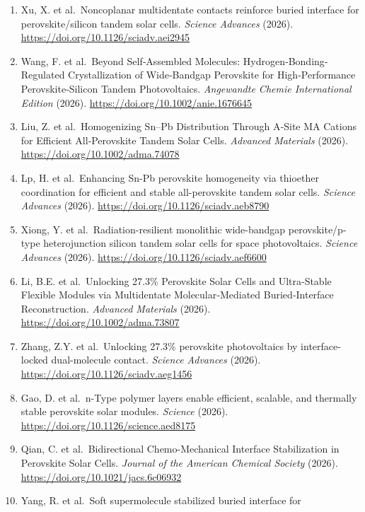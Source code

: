 \documentclass[
  11pt,
]{article}
\providecommand{\tightlist}{%
  \setlength{\itemsep}{0pt}\setlength{\parskip}{0pt}}
\begin{document}
\begin{enumerate}
\def\labelenumi{\arabic{enumi}.}
\tightlist
\item
  Xu, X. et al.~Noncoplanar multidentate contacts reinforce buried
  interface for perovskite/silicon tandem solar cells. \emph{Science
  Advances} (2026). \url{https://doi.org/10.1126/sciadv.aei2945}
\item
  Wang, F. et al.~Beyond Self‐Assembled Molecules:
  Hydrogen‐Bonding‐Regulated Crystallization of Wide‐Bandgap Perovskite
  for High‐Performance Perovskite‐Silicon Tandem Photovoltaics.
  \emph{Angewandte Chemie International Edition} (2026).
  \url{https://doi.org/10.1002/anie.1676645}
\item
  Liu, Z. et al.~Homogenizing Sn--Pb Distribution Through A‐Site MA
  Cations for Efficient All‐Perovskite Tandem Solar Cells.
  \emph{Advanced Materials} (2026).
  \url{https://doi.org/10.1002/adma.74078}
\item
  Lp, H. et al.~Enhancing Sn-Pb perovskite homogeneity via thioether
  coordination for efficient and stable all-perovskite tandem solar
  cells. \emph{Science Advances} (2026).
  \url{https://doi.org/10.1126/sciadv.aeb8790}
\item
  Xiong, Y. et al.~Radiation-resilient monolithic wide-bandgap
  perovskite/p-type heterojunction silicon tandem solar cells for space
  photovoltaics. \emph{Science Advances} (2026).
  \url{https://doi.org/10.1126/sciadv.aef6600}
\item
  Li, B.E. et al.~Unlocking 27.3\% Perovskite Solar Cells and
  Ultra‐Stable Flexible Modules via Multidentate Molecular‐Mediated
  Buried‐Interface Reconstruction. \emph{Advanced Materials} (2026).
  \url{https://doi.org/10.1002/adma.73807}
\item
  Zhang, Z.Y. et al.~Unlocking 27.3\% perovskite photovoltaics by
  interface-locked dual-molecule contact. \emph{Science Advances}
  (2026). \url{https://doi.org/10.1126/sciadv.aeg1456}
\item
  Gao, D. et al.~n-Type polymer layers enable efficient, scalable, and
  thermally stable perovskite solar modules. \emph{Science} (2026).
  \url{https://doi.org/10.1126/science.aed8175}
\item
  Qian, C. et al.~Bidirectional Chemo-Mechanical Interface Stabilization
  in Perovskite Solar Cells. \emph{Journal of the American Chemical
  Society} (2026). \url{https://doi.org/10.1021/jacs.6c06932}
\item
  Yang, R. et al.~Soft supermolecule stabilized buried interface for

\end{enumerate}
\end{document}

